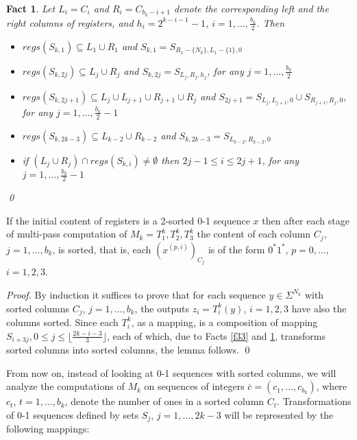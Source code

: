 \documentclass{llncs}
\newtheorem{fact}[theorem]{Fact}
\begin{document}
\begin{fact}\label{f34} Let $L_i=C_i$ and $R_i=C_{b_k-i+1}$ denote the
  corresponding left and the right columns of registers, and
  $h_i=2^{k-i-1}-1$, $i=1,\ldots,\frac{b_k}{2}$. Then
\begin{itemize}
\item[(i)] $regs(S_{k,1})\subseteq L_1\cup R_1$ and $S_{k,1} =
  S_{R_1-\{N_k\},L_1-\{1\},0}$
\item[(ii)] $regs(S_{k,2j})\subseteq L_j\cup R_j$ and
  $S_{k,2j} = S_{L_j,R_j,h_j}$, for any $j=1,\ldots,\frac{b_k}{2}$
\item[(iii)] $regs(S_{k,2j+1})\subseteq L_j\cup L_{j+1}\cup R_{j+1}\cup
  R_j$ and $S_{2j+1} = S_{L_j,L_{j+1},0}\cup S_{R_{j+1},R_j,0}$, for any
  $j=1,\ldots,\frac{b_k}{2}-1$
\item[(iv)] $regs(S_{k,2k-3})\subseteq L_{k-2}\cup R_{k-2}$ and
  $S_{k,2k-3} = S_{L_{k-2},R_{k-2},0}$
\item[(v)] if $(L_j\cup R_j)\cap regs(S_{k,i})\neq\emptyset$ then $2j-1\le
  i\le 2j+1$, for any $j=1,\ldots,\frac{b_k}{2}-1$
\end{itemize} \qed
\end{fact}
\begin{lemma} \label{l35} If the initial content of registers is a
  2-sorted 0-1 sequence $x$ then after each stage of multi-pass
  computation of $M_k=T^k_1,T^k_2,T^k_3$ the content of each column $C_j$,
  $j=1,\ldots,b_k$, is sorted, that is, each $(x^{(p,i)})_{C_j}$ is of
  the form $0^*1^*$, $p=0,\ldots$, $i=1,2,3$.
\end{lemma}
\begin{proof} By induction it suffices to prove that for each sequence
  $y\in\Sigma^{N_k}$ with sorted columns $C_j$, $j=1,\ldots,b_k$, the
  outputs $z_i=T^k_i(y)$, $i=1,2,3$ have also the columns sorted. Since
  each $T^k_i$, as a mapping, is a composition of mapping $S_{i+3j}, 0 \le
  j\le \lfloor \frac{2k-i-3}{3} \rfloor$, each of which, due to Facts 
  \ref{f33} and \ref{f34}, transforms sorted columns into sorted columns, the
  lemma follows. \qed
\end{proof}
From now on, instead of looking at 0-1 sequences with sorted columns, we
will analyze the computations of $M_k$ on sequences of integers
$\overline{c}=(c_1,\ldots,c_{b_k})$, where $c_t$, $t=1,\ldots,b_k$,
denote the number of ones in a sorted column $C_t$. Transformations of
0-1 sequences defined by sets $S_j$, $j=1,\ldots,2k-3$ will be
represented by the following mappings:
\end{document}
